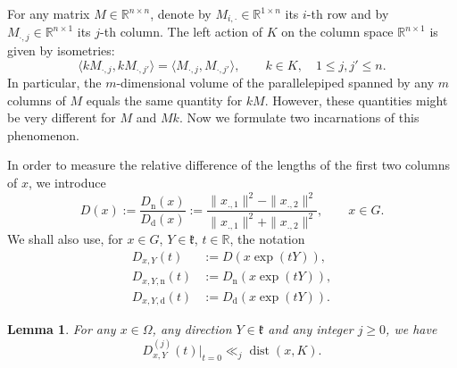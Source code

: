 \documentclass[11pt,oneside]{amsart}
\numberwithin{equation}{section}
\theoremstyle{remark}
\theoremstyle{plain}
\newtheorem{lemma}{Lemma}
\DeclareMathOperator{\dist}{dist}
\newcommand\RR{\mathbb{R}}
\newcommand\mfk{\mathfrak{k}}
\renewcommand\leq{\leqslant}
\renewcommand\geq{\geqslant}
\begin{document}
For any matrix $M\in\RR^{n\times n}$, denote by $M_{i,\cdot}\in\RR^{1\times n}$ its $i$-th row and by $M_{\cdot,j}\in\RR^{n\times 1}$ its $j$-th column. The left action of $K$ on the column space $\RR^{n\times 1}$ is given by isometries:
\[
\langle kM_{\cdot,j},kM_{\cdot,j'} \rangle = \langle M_{\cdot,j},M_{\cdot,j'}\rangle, \qquad k\in K,\quad 1\leq j,j'\leq n.
\]
In particular, the $m$-dimensional volume of the parallelepiped spanned by any $m$ columns of $M$ equals the same quantity for $kM$. However, these quantities might be very different for $M$ and $Mk$. Now we formulate two incarnations of this phenomenon.

In order to measure the relative difference of the lengths of the first two columns of $x$, we introduce
\begin{equation}\label{eq:D-def}
D(x):=\frac{D_{\text{n}}(x)}{D_{\text{d}}(x)}:=\frac{\|x_{.,1}\|^2-\|x_{.,2}\|^2}{\|x_{.,1}\|^2+\|x_{.,2}\|^2}, \qquad x\in G.
\end{equation}
We shall also use, for $x\in G$, $Y\in\mfk$, $t\in\RR$, the notation
\begin{align*}
D_{x,Y}(t)&:=D(x \exp(tY)),\\
D_{x,Y,\text{n}}(t)&:=D_{\text{n}}(x \exp(tY)),\\
D_{x,Y,\text{d}}(t)&:=D_{\text{d}}(x \exp(tY)).
\end{align*}

\begin{lemma}\label{lemma:D-derivatives-upper-bound}
For any $x\in \Omega$, any direction $Y\in\mfk$ and any integer $j\geq 0$, we have
\[
D_{x,Y}^{(j)}(t)|_{t=0} \ll_{j} \dist(x,K).
\]
\end{lemma}
\end{document}
